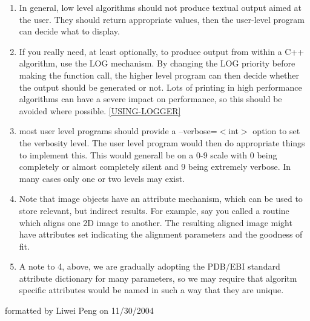 \begin{enumerate}
\item In general, low level algorithms should not produce textual output aimed at the user. They should return appropriate values, then the user-level program can decide what to display. 
\item If you really need, at least optionally, to produce output from within a C++ algorithm, use the LOG mechanism. By changing the LOG priority before making the function call, the higher level program can then decide whether the output should be generated or not. Lots of printing in high performance algorithms can have a severe impact on performance, so this should be avoided where possible. \ref{USING-LOGGER}
\item most user level programs should provide a --verbose=$<$int$>$ option to set the verbosity level. The user level program would then do appropriate things to implement this. This would generall be on a 0-9 scale with 0 being completely or almost completely silent and 9 being extremely verbose. In many cases only one or two levels may exist. 
\item Note that image objects have an attribute mechanism, which can be used to store relevant, but indirect results. For example, say you called a routine which aligns one 2D image to another. The resulting aligned image might have attributes set indicating the alignment parameters and the goodness of fit.
\item A note to 4, above, we are gradually adopting the PDB/EBI standard attribute dictionary for many parameters, so we may require that algoritm specific attributes would be named in such a way that they are unique.

\end{enumerate}


 

formatted by Liwei Peng on 11/30/2004\\ 



%

